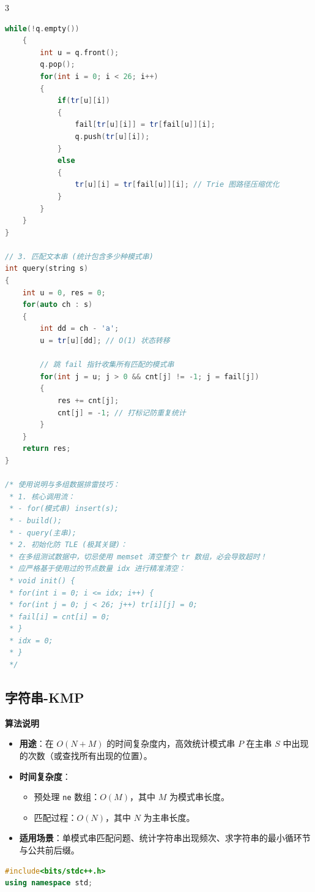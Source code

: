 \documentclass[10pt,landscape,a4paper]{article}
\begin{document}
\begin{multicols*}{3}
\begin{lstlisting}[language=C++]
    while(!q.empty())
    {
        int u = q.front();
        q.pop();
        for(int i = 0; i < 26; i++)
        {
            if(tr[u][i])
            {
                fail[tr[u][i]] = tr[fail[u]][i];
                q.push(tr[u][i]);
            }
            else
            {
                tr[u][i] = tr[fail[u]][i]; // Trie 图路径压缩优化
            }
        }
    }
}

// 3. 匹配文本串 (统计包含多少种模式串)
int query(string s)
{
    int u = 0, res = 0;
    for(auto ch : s)
    {
        int dd = ch - 'a';
        u = tr[u][dd]; // O(1) 状态转移

        // 跳 fail 指针收集所有匹配的模式串
        for(int j = u; j > 0 && cnt[j] != -1; j = fail[j])
        {
            res += cnt[j];
            cnt[j] = -1; // 打标记防重复统计
        }
    }
    return res;
}

/* 使用说明与多组数据排雷技巧：
 * 1. 核心调用流：
 * - for(模式串) insert(s);
 * - build();
 * - query(主串);
 * 2. 初始化防 TLE (极其关键)：
 * 在多组测试数据中，切忌使用 memset 清空整个 tr 数组，必会导致超时！
 * 应严格基于使用过的节点数量 idx 进行精准清空：
 * void init() {
 * for(int i = 0; i <= idx; i++) {
 * for(int j = 0; j < 26; j++) tr[i][j] = 0;
 * fail[i] = cnt[i] = 0;
 * }
 * idx = 0;
 * }
 */
\end{lstlisting}
\subsection*{字符串-KMP}
\par\addvspace{0.7ex}\noindent\textbf{算法说明}\par\nobreak
\begin{itemize}
\item \textbf{用途}：在 $O(N+M)$ 的时间复杂度内，高效统计模式串 $P$ 在主串 $S$ 中出现的次数（或查找所有出现的位置）。
\item \textbf{时间复杂度}：
\begin{itemize}
\item 预处理 \texttt{n\allowbreak{}e} 数组：$O(M)$，其中 $M$ 为模式串长度。
\item 匹配过程：$O(N)$，其中 $N$ 为主串长度。
\end{itemize}
\item \textbf{适用场景}：单模式串匹配问题、统计字符串出现频次、求字符串的最小循环节与公共前后缀。
\end{itemize}
\par{}\par
\begin{lstlisting}[language=C++]
#include<bits/stdc++.h>
using namespace std;


\end{lstlisting}
\end{multicols*}
\end{document}
